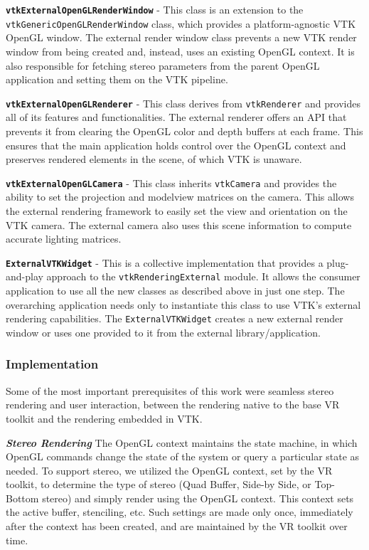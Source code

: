 \textbf{\texttt{vtkExternalOpenGLRenderWindow}} - This class is an extension to
the \texttt{vtkGenericOpenGLRenderWindow} class, which provides a
platform-agnostic VTK OpenGL window.
The external render window class prevents a new VTK render window from being
created and, instead, uses an existing OpenGL context.
It is also responsible for fetching stereo parameters from the parent OpenGL
application and setting them on the VTK pipeline.

\textbf{\texttt{vtkExternalOpenGLRenderer}} - This class derives from
\texttt{vtkRenderer} and provides all of its features and functionalities. The
external renderer offers an API that prevents it from clearing the OpenGL color
and depth buffers at each frame. This ensures that the main application holds
control over the OpenGL context and preserves rendered elements in the scene, of
which VTK is unaware.

\textbf{\texttt{vtkExternalOpenGLCamera}} - This class inherits
\texttt{vtkCamera} and provides the ability to set the projection and modelview
matrices on the camera. This allows the external rendering framework to easily
set the view and orientation on the VTK camera. The external camera also uses
this scene information to compute accurate lighting matrices.

\textbf{\texttt{ExternalVTKWidget}} - This is a collective implementation that
provides a plug-and-play approach to the \texttt{vtkRenderingExternal} module.
It allows the consumer application to use all the new classes as described above
in just one step. The overarching application needs only to instantiate this
class to use VTK's external rendering capabilities. The
\texttt{ExternalVTKWidget} creates a new external render window or uses one
provided to it from the external library/application.

\subsubsection{Implementation}

Some of the most important prerequisites of this work were seamless stereo
rendering and user interaction, between the rendering native to the base VR toolkit and the rendering embedded in VTK. 

\textbf{\textit{Stereo Rendering}} The OpenGL context maintains the state machine, in which OpenGL commands change the state of the system or query a particular state as needed.
To support stereo, we utilized the OpenGL context, set by the VR toolkit, to determine the type of stereo (Quad Buffer, Side-by Side, or Top-Bottom stereo) and simply render using the OpenGL context. This context sets the active buffer, stenciling, etc.
Such settings are made only once, immediately after the context has been created, and are maintained by the VR toolkit over time. 

